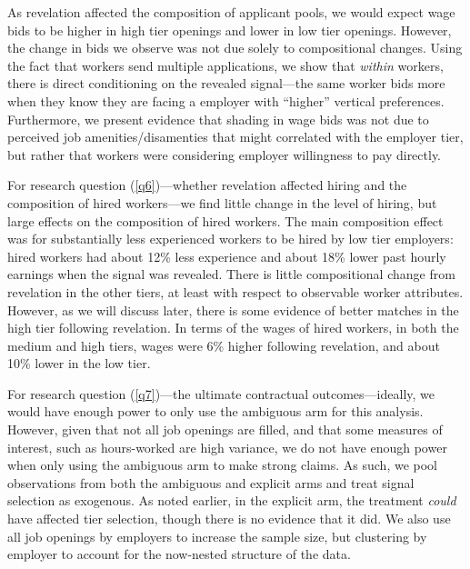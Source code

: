 As revelation affected the composition of applicant pools, we would expect wage bids to be higher in high tier openings and lower in low tier openings.  
However, the change in bids we observe was not due solely to compositional changes.
Using the fact that workers send multiple applications, we show that \emph{within} workers, there is direct conditioning on the revealed signal---the same worker bids more when they know they are facing a employer with ``higher'' vertical preferences.
Furthermore, we present evidence that shading in wage bids was not due to perceived job amenities/disamenties that might correlated with the employer tier, but rather that workers were considering employer willingness to pay directly.

For research question (\ref{q6})---whether revelation affected hiring and the composition of hired workers---we find little change in the level of hiring, but large effects on the composition of hired workers. 
The main composition effect was for substantially less experienced workers to be hired by low tier employers:
hired workers had about 12\% less experience and about 18\% lower past hourly earnings when the signal was revealed.
There is little compositional change from revelation in the other tiers, at least with respect to observable worker attributes.
However, as we will discuss later, there is some evidence of better matches in the high tier following revelation.
In terms of the wages of hired workers, in both the medium and high tiers, wages were 6\% higher following revelation, and about 10\% lower in the low tier. 

For research question (\ref{q7})---the ultimate contractual outcomes---ideally, we would have enough power to only use the ambiguous arm for this analysis.
However, given that not all job openings are filled, and that some measures of interest, such as hours-worked are high variance, we do not have enough power when only using the ambiguous arm to make strong claims. 
As such, we pool observations from both the ambiguous and explicit arms and treat signal selection as exogenous.
As noted earlier, in the explicit arm, the treatment \emph{could} have affected tier selection, though there is no evidence that it did.
We also use all job openings by employers to increase the sample size, but clustering by employer to account for the now-nested structure of the data. 

